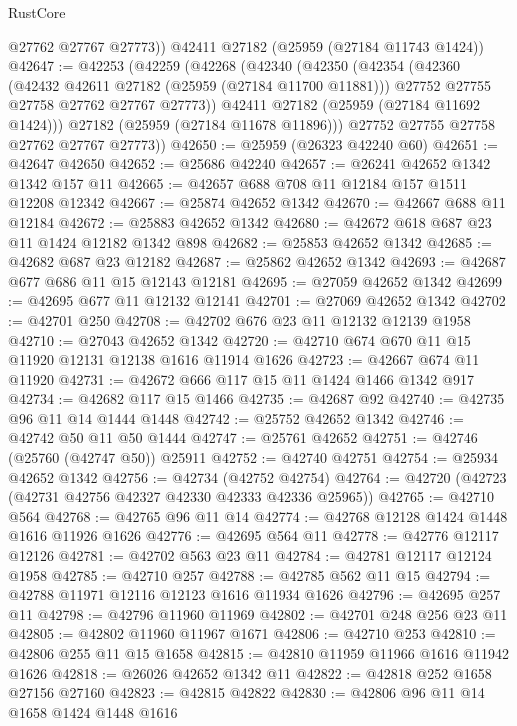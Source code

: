 \begin{lexlean}{RustCore}
\begin{coremodule}
        @27762
        @27767
        @27773))
    @42411
    @27182
    (@25959 (@27184 @11743 @1424))
@42647 := @42253
    (@42259
      (@42268
        (@42340
          (@42350
            (@42354
              (@42360
                (@42432 @42611 @27182 (@25959 (@27184 @11700 @11881)))
                @27752
                @27755
                @27758
                @27762
                @27767
                @27773))
            @42411
            @27182
            (@25959 (@27184 @11692 @1424)))
          @27182
          (@25959 (@27184 @11678 @11896)))
        @27752
        @27755
        @27758
        @27762
        @27767
        @27773))
@42650 := @25959 (@26323 @42240 @60)
@42651 := @42647 @42650
@42652 := @25686 @42240
@42657 := @26241 @42652 @1342 @1342 @157 @11
@42665 := @42657 @688 @708 @11 @12184 @157 @1511 @12208 @12342
@42667 := @25874 @42652 @1342
@42670 := @42667 @688 @11 @12184
@42672 := @25883 @42652 @1342
@42680 := @42672 @618 @687 @23 @11 @1424 @12182 @1342 @898
@42682 := @25853 @42652 @1342
@42685 := @42682 @687 @23 @12182
@42687 := @25862 @42652 @1342
@42693 := @42687 @677 @686 @11 @15 @12143 @12181
@42695 := @27059 @42652 @1342
@42699 := @42695 @677 @11 @12132 @12141
@42701 := @27069 @42652 @1342
@42702 := @42701 @250
@42708 := @42702 @676 @23 @11 @12132 @12139 @1958
@42710 := @27043 @42652 @1342
@42720 := @42710 @674 @670 @11 @15 @11920 @12131 @12138 @1616 @11914 @1626
@42723 := @42667 @674 @11 @11920
@42731 := @42672 @666 @117 @15 @11 @1424 @1466 @1342 @917
@42734 := @42682 @117 @15 @1466
@42735 := @42687 @92
@42740 := @42735 @96 @11 @14 @1444 @1448
@42742 := @25752 @42652 @1342
@42746 := @42742 @50 @11 @50 @1444
@42747 := @25761 @42652
@42751 := @42746 (@25760 (@42747 @50)) @25911
@42752 := @42740 @42751
@42754 := @25934 @42652 @1342
@42756 := @42734 (@42752 @42754)
@42764 := @42720 (@42723 (@42731 @42756 @42327 @42330 @42333 @42336 @25965))
@42765 := @42710 @564
@42768 := @42765 @96 @11 @14
@42774 := @42768 @12128 @1424 @1448 @1616 @11926 @1626
@42776 := @42695 @564 @11
@42778 := @42776 @12117 @12126
@42781 := @42702 @563 @23 @11
@42784 := @42781 @12117 @12124 @1958
@42785 := @42710 @257
@42788 := @42785 @562 @11 @15
@42794 := @42788 @11971 @12116 @12123 @1616 @11934 @1626
@42796 := @42695 @257 @11
@42798 := @42796 @11960 @11969
@42802 := @42701 @248 @256 @23 @11
@42805 := @42802 @11960 @11967 @1671
@42806 := @42710 @253
@42810 := @42806 @255 @11 @15 @1658
@42815 := @42810 @11959 @11966 @1616 @11942 @1626
@42818 := @26026 @42652 @1342 @11
@42822 := @42818 @252 @1658 @27156 @27160
@42823 := @42815 @42822
@42830 := @42806 @96 @11 @14 @1658 @1424 @1448 @1616

\end{coremodule}
\end{lexlean}
